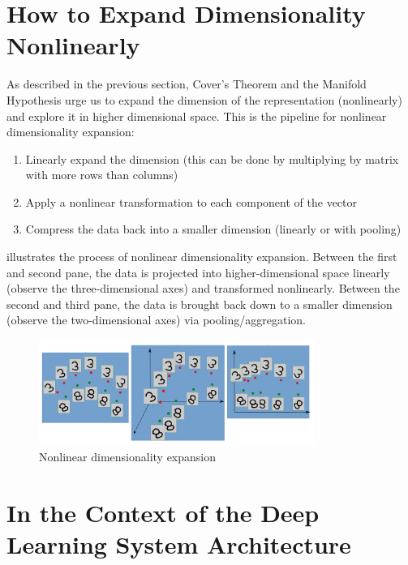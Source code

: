 \section{How to Expand Dimensionality Nonlinearly}\label{sec: expand_dim}

As described in the previous section, Cover's Theorem and the Manifold Hypothesis urge us to expand the dimension of the representation (nonlinearly) and explore it in higher dimensional space.
This is the pipeline for nonlinear dimensionality expansion:
\begin{enumerate}
    \item Linearly expand the dimension (this can be done by multiplying by matrix with more rows than columns)
    \item Apply a nonlinear transformation to each component of the vector
    \item Compress the data back into a smaller dimension (linearly or with pooling) 
\end{enumerate}

 illustrates the process of nonlinear dimensionality expansion.
Between the first and second pane, the data is projected into higher-dimensional space linearly (observe the three-dimensional axes) and transformed nonlinearly.
Between the second and third pane, the data is brought back down to a smaller dimension (observe the two-dimensional axes) via pooling/aggregation.

\begin{figure}[ht]
\centering
\includegraphics[width=90mm]{lectures/01-b/nonlinear_expansion.png}
\caption{Nonlinear dimensionality expansion}
\label{fig:nonlinear_expansion}
\end{figure}

\section{In the Context of the Deep Learning System Architecture}

